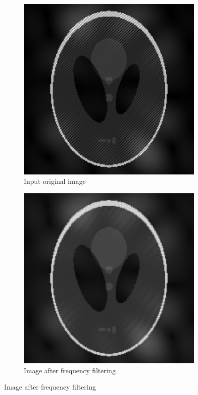 \documentclass[UTF8]{ctexart}
\begin{document}
\begin{figure}[htbp]
    \centering
    \begin{subfigure}{0.5\textwidth}
        \centering
        \includegraphics[width=0.8\linewidth]{hw4.png}
        \caption{Input original image}
    \end{subfigure}%
    \hfill
    \begin{subfigure}{0.5\textwidth}
        \centering
        \includegraphics[width=0.8\linewidth]{brainct.png}
        \caption{Image after frequency filtering}
    \end{subfigure}%


\end{figure}
\end{document}
